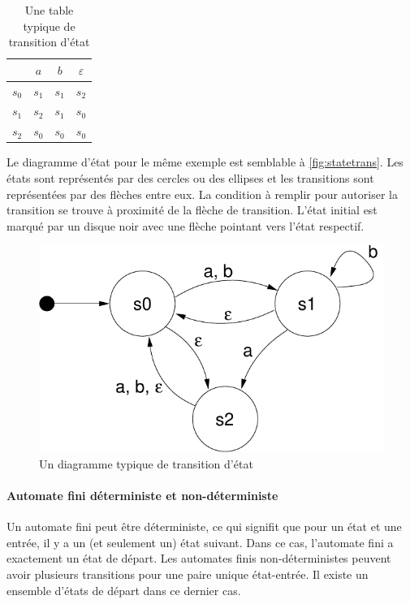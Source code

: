 \documentclass[a4paper,12pt,BCOR6mm,bibtotoc,idxtotoc]{scrbook}
\begin{document}
\begin{table}[htbp]
  \caption{Une table typique de transition d'\'etat}
  \label{tab:statetrans}
  \vspace{2mm}
  \centering
  \begin{tabular}{l|ccc}
    & $a$ & $b$ & $\varepsilon$\\ \hline
    $s_0$ & $s_1$ & $s_1$ & $s_2$\\
    $s_1$ & $s_2$ & $s_1$ & $s_0$\\
    $s_2$ & $s_0$ & $s_0$ & $s_0$\\ \hline
  \end{tabular}
\end{table}

Le diagramme d'\'etat pour le m\^eme exemple est semblable \`a
\autoref{fig:statetrans}. Les \'etats sont repr\'esent\'es par des
cercles ou des ellipses et les transitions sont repr\'esent\'ees par
des fl\`eches entre eux.  La condition \`a remplir pour autoriser la
transition se trouve \`a proximit\'e de la fl\`eche de transition.
L'\'etat initial est marqu\'e par un disque noir avec une fl\`eche
pointant vers l'\'etat respectif.

\begin{figure}[htbp]
  \centering
  \includegraphics[width=.5\textwidth]{images/statetrans}
  \caption{Un diagramme typique de transition d'\'etat}
  \label{fig:statetrans}
\end{figure}

\paragraph{Automate fini d\'eterministe et non-d\'eterministe}

Un automate fini peut \^etre d\'eterministe, ce qui signifit que pour
un \'etat et une entr\'ee, il y a un (et seulement un) \'etat
suivant. Dans ce cas, l'automate fini a exactement un \'etat de
d\'epart. Les automates finis non-d\'eterministes peuvent avoir
plusieurs transitions pour une paire unique \'etat-entr\'ee.
Il existe un ensemble d'\'etats de d\'epart dans ce dernier cas.
\end{document}
